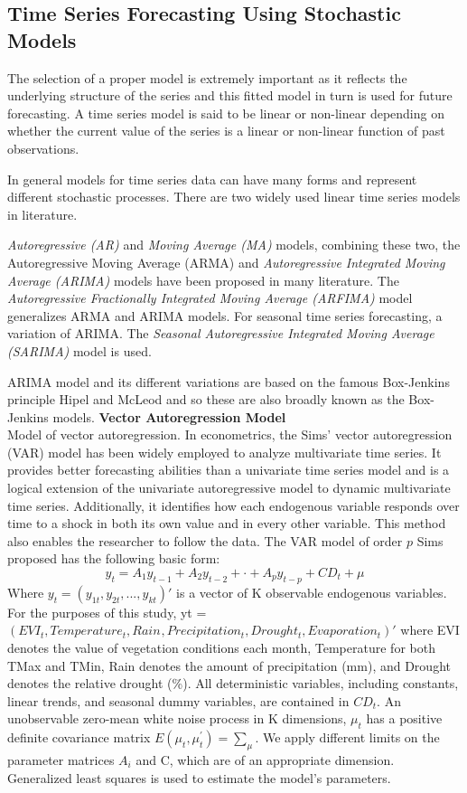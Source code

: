  \subsection{Time Series Forecasting Using Stochastic Models}
 The selection of a proper model is extremely important as it reflects the underlying structure of the series and this fitted model in turn is
 used for future forecasting. A time series model is said to be linear or non-linear depending on whether the current value of the series is a
 linear or non-linear function of past observations.
 
 In general models for time series data can have many forms and represent different stochastic processes. There are two widely used linear time series models in literature.
 
 \emph{Autoregressive (AR)} and \emph{Moving Average (MA)} models, combining these two, the Autoregressive Moving Average (ARMA) and  \emph{Autoregressive Integrated Moving Average (ARIMA)} models have been proposed in many literature. The \emph{Autoregressive Fractionally Integrated Moving Average (ARFIMA)} model generalizes ARMA and ARIMA models. For seasonal time series forecasting, a variation of ARIMA. The  \emph{Seasonal Autoregressive Integrated Moving Average (SARIMA)}  model is used.
 
 ARIMA model and its different variations are based on the famous Box-Jenkins principle Hipel and McLeod \parencite{hipel1994} and so these are also broadly known as the Box-Jenkins models.
\textbf{Vector Autoregression Model}\\
Model of vector autoregression. In econometrics, the Sims' vector autoregression (VAR) model has been widely employed to analyze multivariate time series. It provides better forecasting abilities than a univariate time series model and is a logical extension of the univariate autoregressive model to dynamic multivariate time series. Additionally, it identifies how each endogenous variable responds over time to a shock in both its own value and in every other variable. This method also enables the researcher to follow the data. The VAR model of order $p$ Sims \parencite{sims1980macroeconomics} proposed has the following basic form:
\begin{equation}
	y_{t} = A_{1}y_{t-1} + A_{2}y_{t-2} +\cdot+A_{p}y_{t-p}+ CD_{t} + \mu 
\end{equation}
Where $ y_{t} = \left( y_{1t},y_{2t},...,y_{kt}\right)'$ is a vector of K observable endogenous variables. For the purposes of this study, yt = $(EVI_{t}, Temperature_{t}, Rain_{}, Precipitation_{t},Drought_{t},Evaporation_{t})'$ where EVI denotes the value of vegetation conditions  each month, Temperature for both TMax and TMin, Rain denotes the amount of precipitation (mm), and Drought denotes the relative drought (\%). All deterministic variables, including constants, linear trends, and seasonal dummy variables, are contained in $CD_{t}$. An unobservable zero-mean white noise process in K dimensions, $\mu_{t}$ has a positive definite covariance matrix $E(\mu_{t},\mu_{t}^{'}) = \sum_{\mu}$. We  apply different limits on the parameter matrices $A_{i}$ and C, which are of an appropriate dimension.
Generalized least squares is used to estimate the model's parameters.

